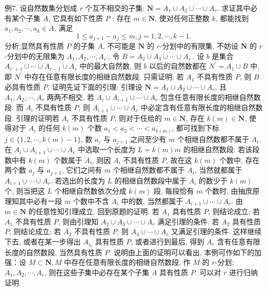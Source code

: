 例7. 设自然数集分划成 $r$ 个互不相交的子集: $\mathbf{N}=A_1 \cup A_2 \cup \cdots \cup A_r$. 求证其中必有某个子集 $A$, 它具有如下性质 $P$ : 存在 $m \in \mathbf{N}$, 使对任何正整数 $k$, 都能找到 $a_1, a_2, \cdots, a_k \in A$, 满足
$$
1 \leqslant a_{j+1}-a_j \leqslant m, j=1,2, \cdots, k-1 .
$$
分析:显然具有性质 $P$ 的子集 $A$, 不可能是 $\mathbf{N}$ 的 $r$-分划中的有限集.
不妨设 $\mathbf{N}$ 的 $r$-分划中的无限集为 $A_1, A_2, \cdots, A_{r^{\prime}}$, 令 $B=A_2 \cup A_3 \cup \cdots \cup A_{r^{\prime}}$. 设 $b$ 是集合 $A_{r^{\prime}+1} \cup \cdots \cup A_{r-1} \cup A_r$ 中的最大自然数, 则 $b$ 以后的自然数都在 $N^{\prime}= A_1 \cup B$ 中, 即 $N^{\prime}$ 中存在任意有限长度的相继自然数段.
只需证明: 若 $A_1$ 不具有性质 $P$, 则 $B$ 必具有性质 $P$.
证明先证下面的引理:
引理设 $\mathbf{N}=A_1 \cup A_2 \cup \cdots \cup A_r$, 且 $A_1, A_2, \cdots, A_r$ 两两不相交.
若 $A_i \cup A_{i+1} \cup \cdots \cup A_r$ 包含任意有限长度的相继自然数段.
而 $A_i$ 不具有性质 $P$, 则 $A_{i+1} \cup \cdots \cup A_r$ 中必定含有任意有限长度的相继自然数段.
引理的证明若 $A_i$ 不具有性质 $P$, 则对于任给的 $m \in \mathbf{N}$, 存在 $k(m) \in \mathbf{N}$, 使得对于 $A_i$ 的任何 $k(m)$ 个数 $a_1<a_2<\cdots<a_{k(m)}$, 都可找到下标 $j \in\{1,2, \cdots, k(m)-1\}$, 数 $a_j$ 与 $a_{j+1}$ 之间至少有 $m$ 个相继自然数都不属于 $A_i$.
在 $A_i \cup A_{i+1} \cup \cdots \cup A_r$ 中选取一个长度为 $L=k(m) m$ 的相继自然数段.
若该段数中有 $k(m)$ 个数属于 $A_i$, 则因 $A_i$ 不具有性质 $P$, 故在这 $k(m)$ 个数中, 存在两个数 $a_j$ 与 $a_{j+1}$, 它们之间有 $m$ 个相继自然数都不属于 $A_i$, 当然就都属于 $A_{i+1} \cup \cdots \cup A_r$. 若选出的长度为 $L$ 的相继自然数段中属于 $A_i$ 的数少于 $k(m)$ 个, 则当把这 $L$ 个相继自然数依次分成 $k(m)$ 段, 每段恰有 $m$ 个数时, 由抽庶原理知其中必有一段 $m$ 个数中不含 $A_i$ 中的数, 当然都属于 $A_{i+1} \cup \cdots \cup A_r$. 由 $m \in \mathbf{N}$ 的任意性知引理成立.
回到原题的证明.
若 $A_1$ 具有性质 $P$, 则结论成立; 若 $A_1$ 不具有性质 $P$, 则由引理知 $A_2 \cup A_3 \cup \cdots \cup A_r$ 满足引理的条件.
若 $A_2$ 具有性质 $P$, 则结论成立; 若 $A_2$ 不具有性质 $P$, 则 $A_3 \cup \cdots \cup A_r$ 又满足引理的条件.
这样继续下去, 或者在某一步得出 $A_{i_0}$ 具有性质 $P$, 或者进行到最后, 得到 $A_r$ 含有任意有限长度的自然数段, 当然具有性质 $P$.
说明由上面的证明可以看出, 本例可作如下的加强：设 $M \subset \mathbf{N}, M$ 中存在任意有限长度的相继自然数段, 作 $M$ 的 $r$-分划: $A_1, A_2, \cdots, A_r$, 则在这些子集中必存在某个子集 $A$ 具有性质 $P$. 可以对 $r$ 进行归纳证明.



